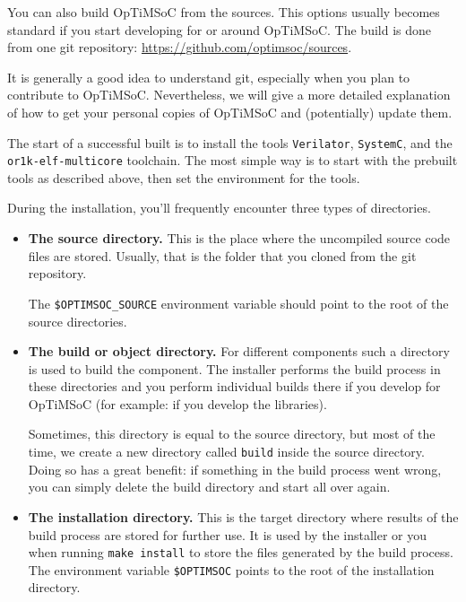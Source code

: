 You can also build OpTiMSoC from the sources. This options usually
becomes standard if you start developing for or around OpTiMSoC. The
build is done from one git repository:
\url{https://github.com/optimsoc/sources}.

It is generally a good idea to understand git, especially when you
plan to contribute to OpTiMSoC. Nevertheless, we will give a more
detailed explanation of how to get your personal copies of OpTiMSoC
and (potentially) update them.

The start of a successful built is to install the tools
\verb|Verilator|, \verb|SystemC|, and the \verb|or1k-elf-multicore|
toolchain. The most simple way is to start with the prebuilt tools as
described above, then set the environment for the tools.

\begin{docnote}
During the installation, you'll frequently encounter three types of
directories.

\begin{itemize}
 \item \textbf{The source directory.} This is the place where the
   uncompiled source code files are stored. Usually, that is the folder that
   you cloned from the git repository.

   The \verb|$OPTIMSOC_SOURCE| environment variable should point to
   the root of the source directories.
 \item \textbf{The build or object directory.} For different
   components such a directory is used to build the component. The
   installer performs the build process in these directories and you
   perform individual builds there if you develop for OpTiMSoC (for
   example: if you develop the libraries).

   Sometimes, this directory is equal to the source directory, but
   most of the time, we create a new directory called \texttt{build}
   inside the source directory. Doing so has a great benefit: if
   something in the build process went wrong, you can simply delete
   the build directory and start all over again.

 \item \textbf{The installation directory.} This is the target
   directory where results of the build process are stored for further
   use. It is used by the installer or you when running \texttt{make
     install} to store the files generated by the build process. The
   environment variable \verb|$OPTIMSOC| points to the root of the
   installation directory.
\end{itemize}

\end{docnote}

